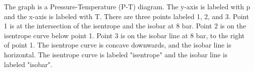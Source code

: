 The graph is a Pressure-Temperature (P-T) diagram. The y-axis is labeled with p and the x-axis is labeled with T. There are three points labeled 1, 2, and 3. Point 1 is at the intersection of the isentrope and the isobar at 8 bar. Point 2 is on the isentrope curve below point 1. Point 3 is on the isobar line at 8 bar, to the right of point 1. The isentrope curve is concave downwards, and the isobar line is horizontal. The isentrope curve is labeled "isentrope" and the isobar line is labeled "isobar".